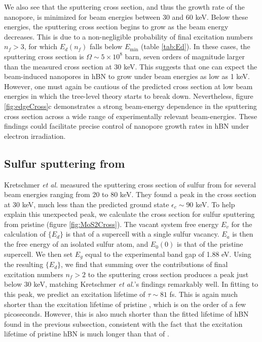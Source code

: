 \documentclass[twoside,twocolumn,9pt]{article}
\begin{document}
We also see that the sputtering cross section, and thus the growth rate of the
nanopore, is minimized for beam energies between 30 and 60 keV.
Below these energies, the sputtering cross section begins to grow as the beam
energy decreases.
This is due to a non-negligible probability of final excitation numbers $n_f >
3$, for which $E_d(n_f)$ falls below $E_\text{min}$ (table \ref{tab:Ed}).
In these cases, the sputtering cross section is $\Omega \sim 5\times10^8$ barn,
seven orders of magnitude larger than the measured cross section at 30 keV.
This suggests that one can expect the beam-induced nanopores in hBN to grow under
beam energies as low as 1 keV.
However, one must again be cautious of the predicted cross section at low beam
energies in which the tree-level theory starts to break down.
Nevertheless, figure \ref{fig:edgeCross}c demonstrates a strong beam-energy
dependence in the sputtering cross section across a wide range of
experimentally relevant beam-energies.
These findings could facilitate precise control of nanopore growth rates in hBN
under electron irradiation.

\subsection{Sulfur sputtering from \texorpdfstring{}{MoS2}}
\label{sec:MoS2}

Kretschmer \textit{et al.} measured the sputtering cross section of sulfur from 
for several beam energies ranging from 20 to 80 keV.\cite{Kretschmer2020}
They found a peak in the cross section at 30 keV, much less than the predicted
ground state $\epsilon_c\sim 90$ keV.\cite{Kretschmer2020}
To help explain this unexpected peak, we calculate the cross section for sulfur
sputtering from pristine  (figure \ref{fig:MoS2Cross}).
The vacant system free energy $E_v$ for the calculation of $\{E_d\}$ is that of a
 supercell with a single sulfur vacancy.
$E_a$ is then the free energy of an isolated sulfur atom, and $E_0(0)$ is that
of the pristine  supercell.
We then set $E_g$ equal to the experimental band gap of 1.88 eV.
\cite{Gusakova2017}
Using the resulting $\{E_d\}$, we find that summing over the contributions
of final excitation numbers $n_f > 2$ to the sputtering cross section produces
a peak just below 30 keV, matching Kretschmer \textit{et al.}'s findings remarkably
well.
In fitting to this peak, we predict an excitation lifetime of $\tau \sim 81$
fs.
This is again much shorter than the excitation lifetime of pristine ,
which is on the order of a few picoseconds.\cite{Korn2011, Lagarde2014,
Palummo2015a}
However, this is also much shorter than the fitted lifetime of hBN found in the
previous subsection, consistent with the fact that the excitation lifetime of
pristine hBN is much longer than that of .
\end{document}
